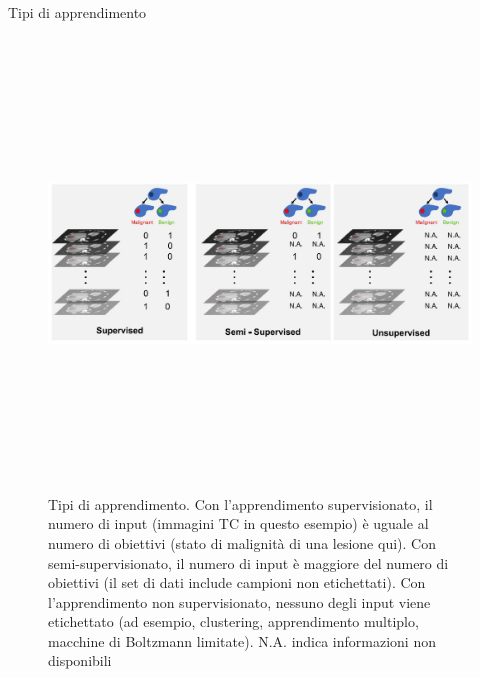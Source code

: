 \documentclass[12pt,a4paper]{report}
\begin{document}
\begin{subsection}{Tipi di apprendimento}
\begin{figure}[h!]
    \begin{center}
        \includegraphics[width=12cm,height=12cm,keepaspectratio]{Type-of-learning}
    \end{center}
    \caption{Tipi di apprendimento. Con l'apprendimento supervisionato, il numero di input (immagini TC in questo esempio) è uguale al numero di obiettivi (stato di malignità di una lesione qui). Con semi-supervisionato, il numero di input è maggiore del numero di obiettivi (il set di dati include campioni non etichettati). Con l'apprendimento non supervisionato, nessuno degli input viene etichettato (ad esempio, clustering, apprendimento multiplo, macchine di Boltzmann limitate). N.A. indica informazioni non disponibili}
    \label{fig:type-of-learning}
\end{figure}


\end{subsection}
\end{document}

